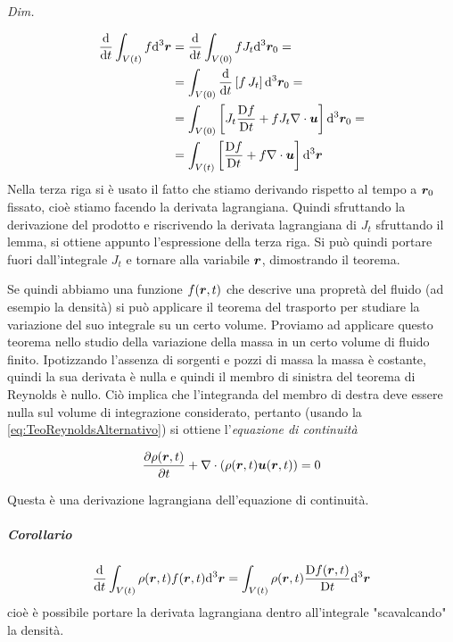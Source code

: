 \textit{Dim.}

\begin{align*}
\frac{\dd}{\dd t} \int_{V(t)} f \dd^3 \V{r} & = \frac{\dd}{\dd t} \int_{V(0)} f J_t \dd^3 \V{r}_0 = \\
& = \int_{V(0)} \frac{\dd}{\dd t} \left[ f \, J_t \right] \dd^3 \V{r}_0 = \\
& = \int_{V(0)} \left[ J_t \frac{\DD f}{\DD t} + f J_t \V{\nabla}\cdot \V{u} \right] \dd^3 \V{r}_0 = \\
& = \int_{V(t)} \left[ \frac{\DD f}{\DD t} + f \V{\nabla}\cdot \V{u} \right] \dd^3 \V{r}
\end{align*}
Nella terza riga si è usato il fatto che stiamo derivando rispetto al tempo a $\V{r}_0$ fissato, cioè stiamo facendo la derivata lagrangiana. Quindi sfruttando la derivazione del prodotto e riscrivendo la derivata lagrangiana di $J_t$ sfruttando il lemma, si ottiene appunto l'espressione della terza riga. Si può quindi portare fuori dall'integrale $J_t$ e tornare alla variabile $\V{r}$, dimostrando il teorema.


Se quindi abbiamo una funzione $f(\V{r},t)$ che descrive una propretà del fluido (ad esempio la densità) si può applicare il teorema del trasporto per studiare la variazione del suo integrale su un certo volume. Proviamo ad applicare questo teorema nello studio della variazione della massa in un certo volume di fluido finito. Ipotizzando l'assenza di sorgenti e pozzi di massa la massa è costante, quindi la sua derivata è nulla e quindi il membro di sinistra del teorema di Reynolds è nullo. Ciò implica che l'integranda del membro di destra deve essere nulla sul volume di integrazione considerato, pertanto (usando la \ref{eq:TeoReynoldsAlternativo}) si ottiene l'\textit{equazione di continuità}
\begin{EQ}
\begin{equation}
\frac{\partial \rho(\V{r}, t)}{\partial t} + \V{\nabla} \cdot (\rho(\V{r}, t) \V{u}(\V{r}, t)) = 0\label{eq:Continuità1}
\end{equation}
\end{EQ}
Questa è una derivazione lagrangiana dell'equazione di continuità.

\subparagraph{Corollario}

\begin{equation}
\frac{\dd}{\dd t} \int_{V(t)} \rho(\V{r}, t) f(\V{r},t) \dd^3 \V{r} =  \int_{V(t)} \rho(\V{r}, t) \frac{\DD f(\V{r},t)}{\DD t} \dd^3 \V{r}
\end{equation}
cioè è possibile portare la derivata lagrangiana dentro all'integrale "scavalcando" la densità.

